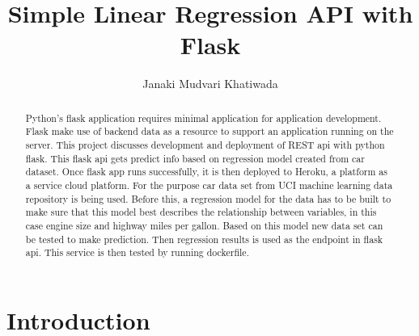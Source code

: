 \title{Simple Linear Regression API with Flask}



\author{Janaki Mudvari Khatiwada}


\renewcommand{\shortauthors}{J. M. Khatiwada}



\begin{abstract}
  Python's flask application requires minimal application for
  application development. Flask make use of backend data as a
  resource to support an application running on the server. This
  project discusses development and deployment of REST api with python
  flask. This flask api gets predict info based on regression model
  created from car dataset. Once flask app runs successfully, it is
  then deployed to Heroku, a platform as a service cloud platform. For
  the purpose car data set from UCI machine learning data repository
  is being used. Before this, a regression model for the data has to
  be built to make sure that this model best describes the
  relationship between variables, in this case engine size and highway
  miles per gallon. Based on this model new data set can be tested to
  make prediction. Then regression results is used as the endpoint in
  flask api. This service is then tested by running dockerfile.
   
\end{abstract}



\maketitle

\section{Introduction}


